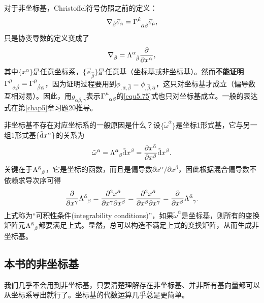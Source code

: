 对于非坐标基，Christoffel符号仿照之前的定义：
\begin{equation}
    \nabla_{\hat{\beta}} \vec{e}_{\hat{\alpha}} = \Gamma\indices{^{\hat{\mu}}_{\hat{\alpha} \hat{\beta}}} \vec{e}_{\hat{\mu}},
\label{equ5.92}
\end{equation}
只是协变导数的定义变成了
\begin{equation}
    \nabla_{\hat{\beta}} = \Lambda\indices{^\alpha_{\hat{\beta}}} \frac{\partial}{\partial x^\alpha},
\label{equ5.93}
\end{equation}
其中$\{x^\alpha\}$是任意坐标系，$\{ \vec{e}_{\hat{\beta}} \}$是任意基（坐标基或非坐标基）。然而\textbf{不能证明}$\Gamma\indices{^{\hat{\mu}}_{\hat{\alpha} \hat{\beta}}} = \Gamma\indices{^{\hat{\mu}}_{\hat{\beta} \hat{\alpha}}}$，因为证明过程要用到$\phi_{,\hat{\alpha} ,\hat{\beta}} = \phi_{,\hat{\beta} ,\hat{\alpha}}$，这只对坐标基才成立（偏导数互相对易）。因此，用$g_{\alpha \beta, \gamma}$表示$\Gamma\indices{^\mu_{\alpha \beta}}$的\eqref{equ5.75}式也只对坐标基成立。一般的表达式在第\ref{chap5}章习题20推导。

非坐标基不存在对应坐标系的一般原因是什么？设$\{ \tilde{\omega}^{\bar{\alpha}} \}$是坐标1形式基，它与另一组1形式基$\{ \tilde{\mathrm{d}} x^\alpha \}$的关系为
\begin{equation}
    \tilde{\omega}^{\bar{\alpha}} = \Lambda\indices{^{\bar{\alpha}}_\beta} \trd x^\beta = \frac{\partial x^{\bar{\alpha}}}{\partial x^\beta} \trd x^\beta.
\label{equ5.94}
\end{equation}
关键在于$\Lambda\indices{^{\bar{\alpha}}_\beta}$，它是坐标的函数，而且是偏导数$\partial x^{\bar{\alpha}} / \partial x^\beta$，因此根据混合偏导数不依赖求导次序可得
\begin{equation}
    \frac{\partial}{\partial x^\gamma} \Lambda\indices{^{\bar{\alpha}}_\beta} = \frac{\partial^2 x^{\bar{\alpha}}}{\partial x^\gamma \partial x^\beta} = \frac{\partial^2 x^{\bar{\alpha}}}{\partial x^\beta \partial x^\gamma} = \frac{\partial}{\partial x^\beta} \Lambda\indices{^{\bar{\alpha}}_\gamma}.
\label{equ5.95}
\end{equation}
上式称为“可积性条件(integrability conditions)”，如果$\tilde{\omega}^{\bar{\alpha}}$是坐标基，则所有的变换矩阵元$\Lambda\indices{^{\bar{\alpha}}_\beta}$都要满足上式。显然，总可以构造不满足上式的变换矩阵，从而生成非坐标基。


\subsection*{本书的非坐标基}
我们几乎不会用到非坐标基，只要清楚理解存在非坐标基、并非所有基向量都可以从坐标系导出就行了。坐标基的代数运算几乎总是更简单。

